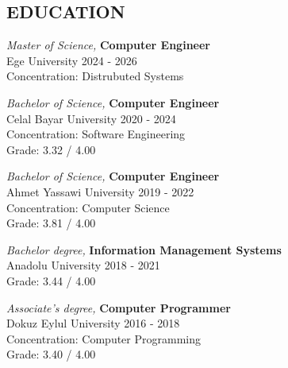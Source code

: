 \documentclass[line,margin]{res}
\begin{document}
\begin{resume}
 
\section{EDUCATION}
                {\sl Master of Science,} \textbf{Computer Engineer} \\
                Ege University 
                2024 - 2026 \\
                Concentration: Distrubuted Systems 

                {\sl Bachelor of Science,} \textbf{Computer Engineer} \\
                Celal Bayar University 
                2020 - 2024 \\
                Concentration: Software Engineering \\
                Grade: 3.32 / 4.00 

                {\sl Bachelor of Science,} \textbf{Computer Engineer} \\
                Ahmet Yassawi University 
                2019 - 2022 \\
                Concentration: Computer Science \\
                Grade: 3.81 / 4.00 
 
                {\sl Bachelor degree,} \textbf{Information Management Systems} \\
                Anadolu University 
                2018 - 2021 \\
                Grade: 3.44 / 4.00 

                {\sl Associate's degree,} \textbf{Computer Programmer} \\
                Dokuz Eylul University 
                2016 - 2018 \\
                Concentration: Computer Programming \\
                Grade: 3.40 / 4.00 
 

\end{resume}
\end{document}
